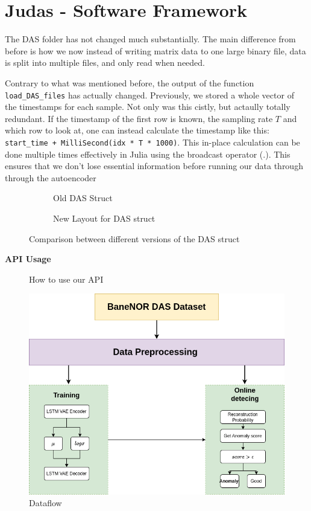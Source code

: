 \section{Judas - Software Framework}

The DAS folder has not changed much substantially. The main difference from before is how we now instead of writing matrix data to one large binary file, data is split into multiple files, and only read when needed.

Contrary to what was mentioned before, the output of the function \texttt{load\_DAS\_files} has actually changed. Previously, we stored a whole vector of the timestamps for each sample. Not only was this cistly, but actaully totally redundant. If the timestamp of the first row is known, the sampling rate $T$ and which row to look at, one can instead calculate the timestamp like this: 
\lstinline|start_time + MilliSecond(idx * T * 1000)|. This in-place calculation can be done multiple times effectively in Julia using the broadcast operator (.). This ensures that we don't lose essential information before running our data through through the autoencoder

\begin{figure}[h]
\centering
\begin{subfigure}{.45\textwidth}
  \centering
  
  \caption{Old DAS Struct}
  \label{fig:olddasstc}
\end{subfigure}%
\hfill
\begin{subfigure}{.45\textwidth}
  \centering
  
  \caption{New Layout for DAS struct}
  \label{fig:newdasstc}
\end{subfigure}
\caption{Comparison between different versions of the DAS struct}
\label{fig:dasstccmp}
\end{figure}



\textbf{API Usage}

\begin{figure}[h]
    \centering
    
    \caption{How to use our API}
    \label{fig:apiusage}
\end{figure}


\begin{figure}[h]
    \centering
    \includegraphics[scale=0.5]{figures/methodflow.png}
    \caption{Dataflow}
    \label{fig:dataflow}
\end{figure}


